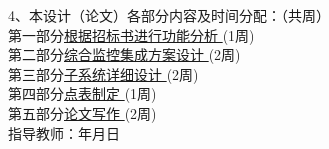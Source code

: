 \hspace{-0.85cm}4、本设计（论文）各部分内容及时间分配：（共\underline{}周）
\\第一部分\uline{\quad 根据招标书进行功能分析 \quad}\hfill(1周)
\\第二部分\uline{\quad 综合监控集成方案设计 \quad}\hfill(2周)
\\第三部分\uline{\quad 子系统详细设计 \quad}\hfill(2周)
\\第四部分\uline{\quad 点表制定 \quad}\hfill(1周)
\\第五部分\uline{\quad 论文写作 \quad}\hfill(2周)
\vspace{16cm}
\\指导教师：\hspace{4cm}年\hspace{1cm}月\hspace{1cm}日
